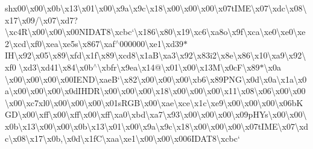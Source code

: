 \begin{DoxyCompactItemize}
sh{}x00\textbackslash{}x00\textbackslash{}x0b\textbackslash{}x13\textbackslash{}x01\textbackslash{}x00\textbackslash{}x9a\textbackslash{}x9c\textbackslash{}x18\textbackslash{}x00\textbackslash{}x00\textbackslash{}x00\textbackslash{}x07t\+I\+M\+E\textbackslash{}x07\textbackslash{}xdc\textbackslash{}x08\textbackslash{}x17\textbackslash{}x09/\textbackslash{}x07\textbackslash{}xd7?\textbackslash{}xc4\+R\textbackslash{}x00\textbackslash{}x00\textbackslash{}x00\+N\+I\+D\+A\+T8\textbackslash{}xcbc`\textbackslash{}x186\textbackslash{}x80\textbackslash{}x19\textbackslash{}xc6\textbackslash{}xa8o\textbackslash{}x9f\textbackslash{}xca\textbackslash{}xe0\textbackslash{}xe0\textbackslash{}xe2\textbackslash{}xcd\textbackslash{}xf0\textbackslash{}xea\textbackslash{}xe5s\textbackslash{}x867\textbackslash{}xaf$^\wedge$000000\textbackslash{}xe1\textbackslash{}xd39$\ast$\+I\+H\textbackslash{}x92\textbackslash{}x05\textbackslash{}x89\textbackslash{}xfd\textbackslash{}x1f\textbackslash{}x89\textbackslash{}xcd8\textbackslash{}x1a\+B\textbackslash{}xa3\textbackslash{}x92\textbackslash{}x83\textquotesingle{}i2\textbackslash{}x8e\textbackslash{}x86\textbackslash{}x10\textbackslash{}xa9\textbackslash{}x92\textbackslash{}xf0 \textbackslash{}xd3\textbackslash{}xd41\textbackslash{}x84\textbackslash{}x0b$^\wedge$\textbackslash{}xbfr\textbackslash{}x9ea\textbackslash{}x14@\textbackslash{}x01\textbackslash{}x00\textbackslash{}x13\+M\textbackslash{}x0c\+F\textbackslash{}x89$\ast$\textbackslash{}x0a \textbackslash{}x00\textbackslash{}x00\textbackslash{}x00\textbackslash{}x00\+I\+E\+N\+D\textbackslash{}xae\+B`\textbackslash{}x82\textbackslash{}x00\textbackslash{}x00\textbackslash{}x00\textbackslash{}xb6\textbackslash{}x89\+P\+N\+G\textbackslash{}x0d\textbackslash{}x0a\textbackslash{}x1a\textbackslash{}x0a\textbackslash{}x00\textbackslash{}x00\textbackslash{}x00\textbackslash{}x0d\+I\+H\+D\+R\textbackslash{}x00\textbackslash{}x00\textbackslash{}x00\textbackslash{}x18\textbackslash{}x00\textbackslash{}x00\textbackslash{}x00\textbackslash{}x11\textbackslash{}x08\textbackslash{}x06\textbackslash{}x00\textbackslash{}x00\textbackslash{}x00\textbackslash{}xc7xl0\textbackslash{}x00\textbackslash{}x00\textbackslash{}x00\textbackslash{}x01s\+R\+G\+B\textbackslash{}x00\textbackslash{}xae\textbackslash{}xce\textbackslash{}x1c\textbackslash{}xe9\textbackslash{}x00\textbackslash{}x00\textbackslash{}x00\textbackslash{}x06b\+K\+G\+D\textbackslash{}x00\textbackslash{}xff\textbackslash{}x00\textbackslash{}xff\textbackslash{}x00\textbackslash{}xff\textbackslash{}xa0\textbackslash{}xbd\textbackslash{}xa7\textbackslash{}x93\textbackslash{}x00\textbackslash{}x00\textbackslash{}x00\textbackslash{}x09p\+H\+Ys\textbackslash{}x00\textbackslash{}x00\textbackslash{}x0b\textbackslash{}x13\textbackslash{}x00\textbackslash{}x00\textbackslash{}x0b\textbackslash{}x13\textbackslash{}x01\textbackslash{}x00\textbackslash{}x9a\textbackslash{}x9c\textbackslash{}x18\textbackslash{}x00\textbackslash{}x00\textbackslash{}x00\textbackslash{}x07t\+I\+M\+E\textbackslash{}x07\textbackslash{}xdc\textbackslash{}x08\textbackslash{}x17\textbackslash{}x0b,\textbackslash{}x0d\textbackslash{}x1f\+C\textbackslash{}xaa\textbackslash{}xe1\textbackslash{}x00\textbackslash{}x00\textbackslash{}x006\+I\+D\+A\+T8\textbackslash{}xcbc` 
\end{DoxyCompactItemize}

